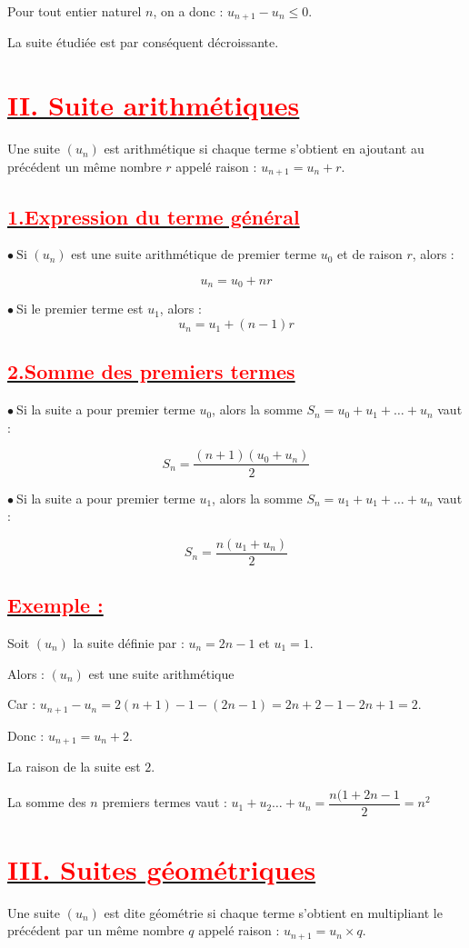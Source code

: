\documentclass[12pt]{article}
\begin{document}
Pour tout entier naturel $n$, on a donc : $u_{n+1}-u_{n}\leq 0.$
	
La suite étudiée est par conséquent décroissante.
\section*{\underline{\textbf{\textcolor{red}{II. Suite arithmétiques}}}}
Une suite $\left(u_{n}\right)$ est arithmétique si chaque terme s'obtient en ajoutant au précédent un même nombre $r$ appelé raison : $u_{n+1}=u_{n}+r.$
	 
\subsection*{\underline{\textbf{\textcolor{red}{1.Expression du terme général}}}}		
$\bullet\ \text{Si }\left(u_{n}\right)$ est une suite arithmétique de premier terme $u_{0}$ et de raison $r$, alors :
	
$$u_{n}=u_{0}+nr$$
	
$\bullet\ $Si le premier terme est $u_{1}$, alors :
$$u_{n}=u_{1}+(n-1)r$$
\subsection*{\underline{\textbf{\textcolor{red}{2.Somme des premiers termes}}}}	
$\bullet\ $Si la suite a pour premier terme $u_{0}$, alors la somme $S_{n}=u_{0}+u_{1}+\ldots+u_{n}$ vaut :
	
$$S_{n}=\dfrac{(n+1)\left(u_{0}+u_{n}\right)}{2}$$

$\bullet\ $Si la suite a pour premier terme $u_{1}$, alors la somme $S_{n}=u_{1}+u_{1}+\ldots+u_{n}$ vaut :

$$S_{n}=\dfrac{n(u_{1}+u_{n})}{2}$$

\subsection*{\underline{\textbf{\textcolor{red}{Exemple :}}}}
Soit $\left(u_{n}\right)$ la suite définie par : $u_{n}=2n-1$ et $u_{1}=1.$

Alors : $\left(u_{n}\right)$ est une suite arithmétique

Car : $u_{n+1}-u_{n}=2(n+1)-1-(2n-1)=2n+2-1-2n+1=2.$

Donc : $u_{n+1}=u_{n}+2.$ 

La raison de la suite est $2.$

La somme des $n$ premiers termes vaut : $u_{1}+u_{2}\ldots+u_{n}=\dfrac{n(1+2n-1}{2}=n^{2}$
\section*{\underline{\textbf{\textcolor{red}{III. Suites géométriques}}}}
Une suite $\left(u_{n}\right)$ est dite géométrie si chaque terme s'obtient en multipliant le précédent par un même nombre $q$ appelé raison : $u_{n+1}=u_{n}\times q.$
\end{document}
